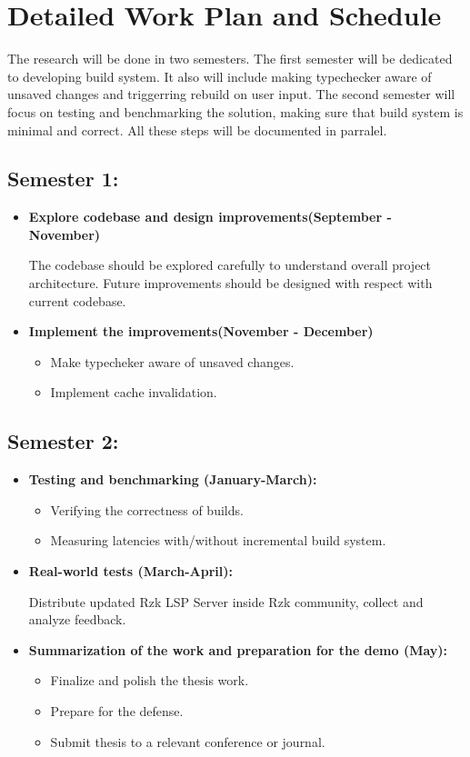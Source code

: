 \documentclass[12pt, a4paper]{article}
\begin{document}
\section{Detailed Work Plan and Schedule}
The research will be done in two semesters.
The first semester will be dedicated to developing build system.
It also will include making typechecker aware of unsaved changes and triggerring rebuild on user input. The second semester will focus on testing and benchmarking the solution, making sure that build system is minimal and correct. All these steps will be documented in parralel.

\subsection*{Semester 1:}
\begin{itemize}[leftmargin=*]
    \item \textbf{Explore codebase and design improvements(September - November)}
    
    The codebase should be explored carefully to understand overall project architecture. Future improvements should be designed with respect with current codebase.

    \item \textbf{Implement the improvements(November - December)}
    \begin{itemize}
        \item Make typecheker aware of unsaved changes.
        \item Implement cache invalidation.
    \end{itemize}
\end{itemize}

\subsection*{Semester 2:}
\begin{itemize}[leftmargin=*]
    \item \textbf{Testing and benchmarking (January-March):}
    \begin{itemize}
        \item Verifying the correctness of builds.
        \item Measuring latencies with/without incremental build system.
    \end{itemize}

    \item \textbf{Real-world tests (March-April):}

    Distribute updated Rzk LSP Server inside Rzk community, collect and analyze feedback.
    
    \item \textbf{Summarization of the work and preparation for the demo (May):}
    \begin{itemize}
        \item Finalize and polish the thesis work.
        \item Prepare for the defense.
        \item Submit thesis to a relevant conference or journal.
    \end{itemize}
\end{itemize}
\end{document}
